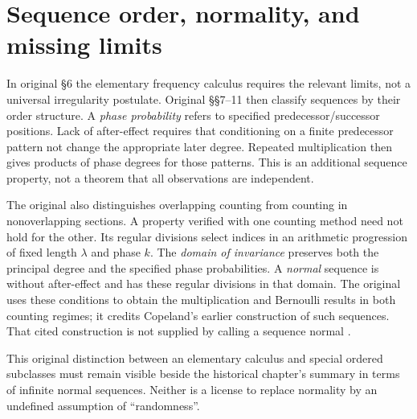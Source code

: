 \section{Sequence order, normality, and missing limits}
\label{sec:p15-reichenbach-normality}

In original §6 the elementary frequency calculus requires the relevant
limits, not a universal irregularity postulate. Original §§7--11 then
classify sequences by their order structure. A \emph{phase probability}
refers to specified predecessor/successor positions. Lack of after-effect
requires that conditioning on a finite predecessor pattern not change
the appropriate later degree. Repeated multiplication then gives
products of phase degrees for those patterns. This is an additional
sequence property, not a theorem that all observations are independent.

The original also distinguishes overlapping counting from counting in
nonoverlapping sections. A property verified with one counting method
need not hold for the other. Its regular divisions select indices in
an arithmetic progression of fixed length \(\lambda\) and phase
\(k\). The \emph{domain of invariance} preserves both the principal
degree and the specified phase probabilities. A \emph{normal} sequence
is without after-effect and has these regular divisions in that domain.
The original uses these conditions to obtain the multiplication and
Bernoulli results in both counting regimes; it credits Copeland's earlier
construction of such sequences. That cited construction is not supplied
by calling a sequence normal
\cite[pp.~288--295]{Reichenbach1937Fondements}.

This original distinction between an elementary calculus and special
ordered subclasses must remain visible beside the historical chapter's
summary in terms of infinite normal sequences. Neither is a license to
replace normality by an undefined assumption of ``randomness''.

